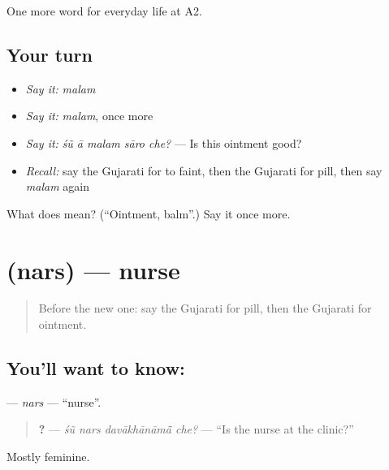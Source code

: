 \begin{grammarlens}[title={What you've built}]
One more word for everyday life at A2.
\end{grammarlens}

\subsection*{Your turn}
\begin{itemize}
\raggedright
  \item \emph{Say it:} \emph{malam}
  \item \emph{Say it:} \emph{malam}, once more
  \item \emph{Say it:} \emph{śũ ā malam sāro che?} — Is this ointment good?
  \item \emph{Recall:} say the Gujarati for to faint, then the Gujarati for pill, then say \emph{malam} again
\end{itemize}

\begin{tcolorbox}[breakable,colback=teal!4,colframe=teal!35!black,title={Before you move on}]
What does  mean? (\textquotedblleft{}Ointment, balm\textquotedblright{}.) Say it once more.
\end{tcolorbox}
\section[\texorpdfstring{\gu{નર્સ} (nars)}{નર્સ (nars)}]{ (nars) — nurse}

\label{lesson:GU-C231-nars}



\begin{quote}
Before the new one: say the Gujarati for pill, then the Gujarati for ointment.
\end{quote}

\subsection*{You'll want to know: }
\textbf{} — \emph{nars} — \textquotedblleft{}nurse\textquotedblright{}.

\begin{quote}
\textbf{   ?} — \emph{śũ nars davākhānāmā̃ che?} — \textquotedblleft{}Is the nurse at the clinic?\textquotedblright{}
\end{quote}

Mostly feminine.

